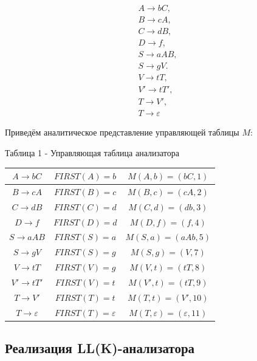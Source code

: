 \documentclass[12pt]{extarticle}
\begin{document}
	\begin{gather*}
		A \rightarrow bC, \\
		B \rightarrow cA, \\
		C \rightarrow dB, \\
		D \rightarrow f, \\
		S \rightarrow aAB, \\  
		S \rightarrow gV. \\
		V \rightarrow tT, \\ 
		V' \rightarrow tT', \\
		T \rightarrow V', \\
		T \rightarrow \varepsilon
	\end{gather*}	
	
	Приведём аналитическое представление управляющей таблицы $M$:
	
	\begin{center}
		
	Таблица 1 - Управляющая таблица анализатора
	
	\begin{tabular}{| c | c | c |}
		\hline
		$A \rightarrow bC$ & $FIRST(A) = b$ & $M(A, b) = (bC, 1)$ \\
		\hline
		$B \rightarrow cA$ & $FIRST(B) = c$ & $M(B, c) = (cA, 2)$ \\
		\hline
		$C \rightarrow dB$ & $FIRST(C) = d$ & $M(C, d) = (db, 3)$ \\
		\hline
		$D \rightarrow f$ & $FIRST(D) = d$ & $M(D, f) = (f, 4)$ \\
		\hline
		$S \rightarrow aAB$ & $FIRST(S) = a$ & $M(S, a) = (aAb, 5)$ \\  
		\hline
		$S \rightarrow gV$ & $FIRST(S) = g$ & $M(S, g) = (V, 7)$ \\
		\hline
		$V \rightarrow tT$ & $FIRST(V) = g$ & $M(V, t) = (tT, 8)$ \\ 
		\hline
		$V' \rightarrow tT'$ & $FIRST(V) = t$ & $M(V', t) = (tT, 9)$ \\
		\hline
		$T \rightarrow V'$ & $FIRST(T) = t$ & $M(T, t) = (V', 10)$ \\
		\hline
		$T \rightarrow \varepsilon$  & $FIRST(T) = \varepsilon$ & $M(T, \varepsilon) = (\varepsilon, 11)$ \\
		\hline
	\end{tabular}
	
	\end{center}
	
	\subsection{Реализация LL(K)-анализатора}
	
\end{document}
